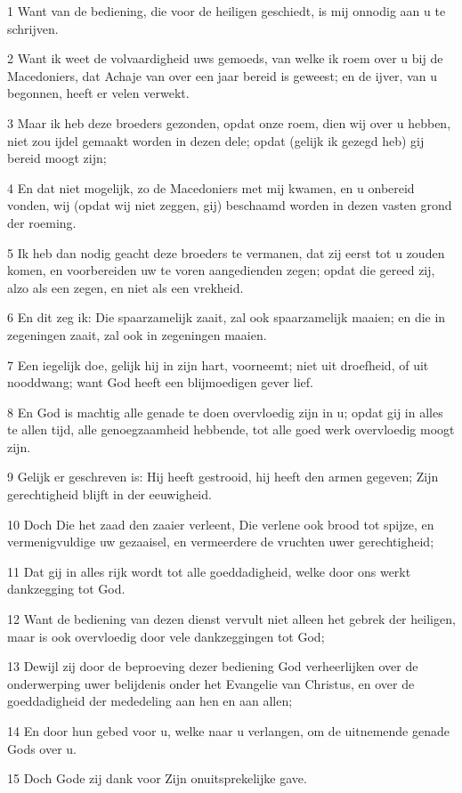 \par 1 Want van de bediening, die voor de heiligen geschiedt, is mij onnodig aan u te schrijven.
\par 2 Want ik weet de volvaardigheid uws gemoeds, van welke ik roem over u bij de Macedoniers, dat Achaje van over een jaar bereid is geweest; en de ijver, van u begonnen, heeft er velen verwekt.
\par 3 Maar ik heb deze broeders gezonden, opdat onze roem, dien wij over u hebben, niet zou ijdel gemaakt worden in dezen dele; opdat (gelijk ik gezegd heb) gij bereid moogt zijn;
\par 4 En dat niet mogelijk, zo de Macedoniers met mij kwamen, en u onbereid vonden, wij (opdat wij niet zeggen, gij) beschaamd worden in dezen vasten grond der roeming.
\par 5 Ik heb dan nodig geacht deze broeders te vermanen, dat zij eerst tot u zouden komen, en voorbereiden uw te voren aangedienden zegen; opdat die gereed zij, alzo als een zegen, en niet als een vrekheid.
\par 6 En dit zeg ik: Die spaarzamelijk zaait, zal ook spaarzamelijk maaien; en die in zegeningen zaait, zal ook in zegeningen maaien.
\par 7 Een iegelijk doe, gelijk hij in zijn hart, voorneemt; niet uit droefheid, of uit nooddwang; want God heeft een blijmoedigen gever lief.
\par 8 En God is machtig alle genade te doen overvloedig zijn in u; opdat gij in alles te allen tijd, alle genoegzaamheid hebbende, tot alle goed werk overvloedig moogt zijn.
\par 9 Gelijk er geschreven is: Hij heeft gestrooid, hij heeft den armen gegeven; Zijn gerechtigheid blijft in der eeuwigheid.
\par 10 Doch Die het zaad den zaaier verleent, Die verlene ook brood tot spijze, en vermenigvuldige uw gezaaisel, en vermeerdere de vruchten uwer gerechtigheid;
\par 11 Dat gij in alles rijk wordt tot alle goeddadigheid, welke door ons werkt dankzegging tot God.
\par 12 Want de bediening van dezen dienst vervult niet alleen het gebrek der heiligen, maar is ook overvloedig door vele dankzeggingen tot God;
\par 13 Dewijl zij door de beproeving dezer bediening God verheerlijken over de onderwerping uwer belijdenis onder het Evangelie van Christus, en over de goeddadigheid der mededeling aan hen en aan allen;
\par 14 En door hun gebed voor u, welke naar u verlangen, om de uitnemende genade Gods over u.
\par 15 Doch Gode zij dank voor Zijn onuitsprekelijke gave.

